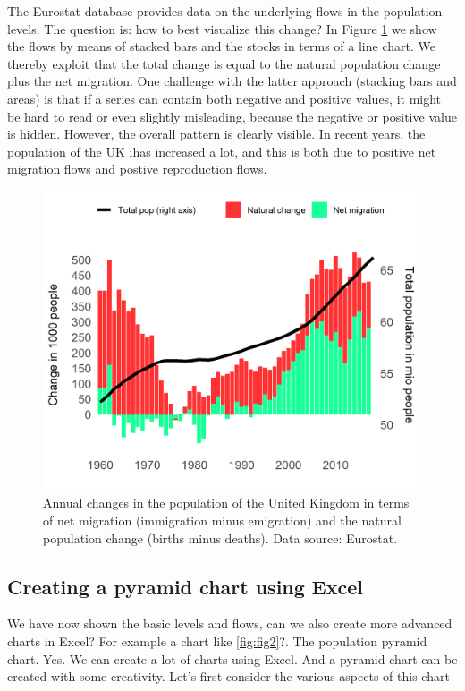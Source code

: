 \documentclass[]{book}
\begin{document}
The Eurostat database provides data on the underlying flows in the population levels. The question is: how to best visualize this change? In Figure \ref{fig:popflows} we show the flows by means of stacked bars and the stocks in terms of a line chart. We thereby exploit that the total change is equal to the natural population change plus the net migration. One challenge with the latter approach (stacking bars and areas) is that if a series can contain both negative and positive values, it might be hard to read or even slightly misleading, because the negative or positive value is hidden. However, the overall pattern is clearly visible. In recent years, the population of the UK ihas increased a lot, and this is both due to positive net migration flows and postive reproduction flows.

\begin{figure}

{\centering \includegraphics[width=0.8\linewidth]{_resources/chapter_people/fig7} 

}

\caption{Annual changes in the  population of the United Kingdom in terms of net migration (immigration minus emigration) and the natural population change (births minus deaths). Data source: Eurostat.}\label{fig:popflows}
\end{figure}

\hypertarget{creating-a-pyramid-chart-using-excel}{%
\subsection{Creating a pyramid chart using Excel}\label{creating-a-pyramid-chart-using-excel}}

We have now shown the basic levels and flows, can we also create more advanced charts in Excel? For example a chart like \ref{fig:fig2}?. The population pyramid chart. Yes. We can create a lot of charts using Excel. And a pyramid chart can be created with some creativity. Let's first consider the various aspects of this chart
\end{document}
